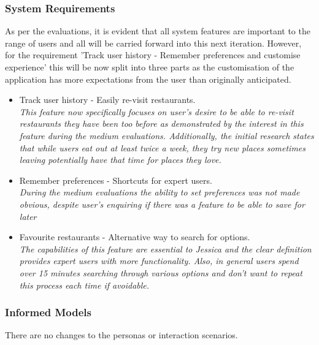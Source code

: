 \documentclass[a4 paper, 12pt]{article}
\begin{document}
    \subsubsection{System Requirements}
    As per the evaluations, it is evident that all system features are important to the range of users and all will be carried forward into this next iteration. However, for the requirement 'Track user history - Remember preferences and customise experience' this will be now split into three parts as the customisation of the application has more expectations from the user than originally anticipated.
        \begin{itemize}
            \item Track user history - Easily re-visit restaurants. \\
            \textit{This feature now specifically focuses on user's desire to be able to re-visit restaurants they have been too before as demonstrated by the interest in this feature during the medium evaluations. Additionally, the initial research states that while users eat out at least twice a week, they try new places sometimes leaving potentially have that time for places they love.}
            \item Remember preferences - Shortcuts for expert users. \\
            \textit{During the medium evaluations the ability to set preferences was not made obvious, despite user's enquiring if there was a feature to be able to save for later}            
            \item Favourite restaurants - Alternative way to search for options. \\
            \textit{The capabilities of this feature are essential to Jessica and the clear definition provides expert users with more functionality. Also, in general users spend over 15 minutes searching through various options and don't want to repeat this process each time if avoidable.}
        \end{itemize}

    \subsubsection{Informed Models}
    There are no changes to the personas or interaction scenarios. 
    
\end{document}

